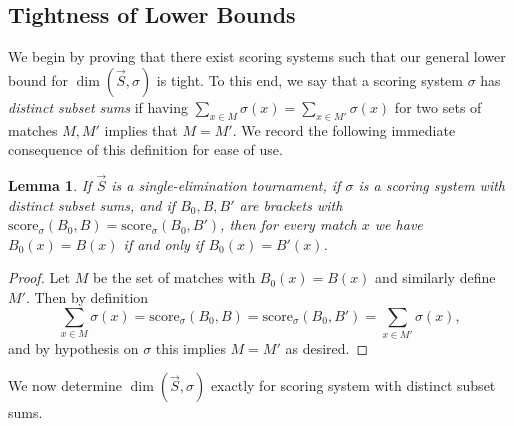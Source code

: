 \documentclass[12pt,letterpaper]{article}
\newtheorem{lem}[thm]{Lemma}
\theoremstyle{definition}
\newcommand{\sig}{\sigma}
\renewcommand{\1}{\mathbbm{1}}
\newcommand{\score}{\mathrm{score}}
\newcommand{\tour}{\vec{S}}
\begin{document}
\subsection{Tightness of Lower Bounds}
We begin by proving that there exist scoring systems such that our general lower bound for $\dim(\tour,\sig)$ is tight.  To this end, we say that a scoring system $\sig$ has \textit{distinct subset sums} if having $\sum_{x\in M} \sig(x)=\sum_{x\in M'} \sig(x)$ for two sets of matches $M,M'$ implies that $M=M'$.   We record the following immediate consequence of this definition for ease of use.
\begin{lem}\label{distinct sums fact}
	If $\tour$ is a single-elimination tournament, if $\sig$ is a scoring system with distinct subset sums, and if $B_0,B,B'$ are brackets with $\score_\sig(B_0,B)=\score_\sig(B_0,B')$, then for every match $x$ we have $B_0(x)=B(x)$ if and only if $B_0(x)=B'(x)$. 
\end{lem}
\begin{proof}
	Let $M$ be the set of matches with $B_0(x)=B(x)$ and similarly define $M'$.  Then by definition
	\[\sum_{x\in M} \sig(x)=\score_\sig(B_0,B)=\score_\sig(B_0,B')=\sum_{x\in M'} \sig(x),\]
	and by hypothesis on $\sig$ this implies $M=M'$ as desired.
\end{proof}


We now determine $\dim(\tour,\sig)$ exactly for scoring system with distinct subset sums.  
\end{document}
